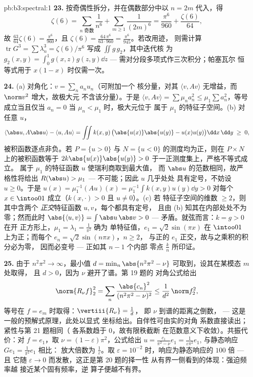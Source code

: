 \begin{solution}{pb:b3:spectral:1}
\textbf{23.} 按奇偶性拆分，并在偶数部分中以 $n = 2m$
代入，得
\[
\zeta(6) = \sum_{n\text{ 奇数}}\frac1{n^6} +
\sum_{m\geq1}\frac1{(2m)^6}
= \frac{\pi^6}{960} + \frac{\zeta(6)}{64},
\]
故 $\frac{63}{64}\zeta(6) = \frac{\pi^6}{960}$，且 $\zeta(6)
= \frac{64\,\pi^6}{63\cdot960} = \frac{\pi^6}{945}$。若改用迹，
则需计算 $\operatorname{tr}G^3 =
\sum\lambda_n^3 = \zeta(6)/\pi^6$ 写成 $\iint g\,g_2$，其中迭代核
为 $g_2(x,y) = \int_0^1g(x,z)g(z,y)\dd z$ ---
需对分段多项式作三次积分；帕塞瓦尔
恒等式用于 $x(1-x)$ 时仅需一次。

\textbf{24.} (a) 对角化：$v = \sum_na_nu_n$（可附加一个
核分量，对其 $\langle v, Av\rangle$
无增益，而 $\norm v^2$ 增大，故极大元
不含该分量）。于是 $\langle v, Av\rangle = \sum\mu_na_n^2 \leq
\mu_1\sum a_n^2$，等号成立当且仅当 $a_n = 0$
当 $\mu_n < \mu_1$ 时，极大元位于
属于 $\mu_1$ 的特征子空间。(b) 对任意 $u$，
\[
\langle\abs u, A\abs u\rangle - \langle u, Au\rangle
= \iint k(x,y)\,\bigl(\abs{u(x)}\abs{u(y)} -
u(x)u(y)\bigr)\dd x\,\dd y \;\geq\; 0,
\]
被积函数逐点非负。若 $P = \{u >
0\}$ 与 $N = \{u < 0\}$ 的测度均为正，则在
$P\times N$ 上的被积函数等于 $2k\abs{u(x)}\abs{u(y)} >
0$ 于一正测度集上，严格不等式成立。
属于 $\mu_1$ 的特征函数 $u$ 使瑞利商取到最大值，
而 $\abs u$ 的范数相同，故严格性将给出
$R(\abs u) > \mu_1$ --- 不可能；因此 $u$ 几乎处处
具有定号，不妨设 $u \geq 0$。于是 $u(x) = \mu_1^{-1}(Au)(x) =
\mu_1^{-1}\int k(x,y)u(y)\dd y > 0$ 对每个 $x \in
\intoo01$ 成立（$k(x,\cdot) > 0$ 且 $u \neq 0$）。(c) 若
特征子空间的维数 $\geq 2$，则其中含两个
\emph{正交}特征函数 $u, v$，每个都具有定号，
且由 (b) 知其在内部处处不为零；然而此时
$\abs{\langle u, v\rangle} = \int\abs u\,\abs v > 0$ ---
矛盾。就弦而言：$k = g > 0$ 在开
正方形上，$\mu_1 = \lambda_1 = \frac1{\pi^2}$ 确为
单特征值，$e_1 = \sqrt2\sin(\pi x)$ 在
$\intoo01$ 上为正；而每个 $e_n = \sqrt2\sin(n\pi x)$，$n \geq 2$，
与正的 $e_1$ 正交，故与之乘积的积分必为零，
因而必变号 --- 正如其 $n - 1$ 个内部
零点 $\frac kn$ 所印证。

\textbf{25.} 由于 $n^2\pi^2 \to \infty$，最小值 $d =
\min_n\abs{n^2\pi^2 - \nu}$ 可取到，设其在某模态 $m$ 处取得，
且 $d > 0$，因为 $\nu$ 避开了谱。第 19 题的
对角公式给出
\[
\norm{R_\nu f}_2^2 =
\sum_n\frac{\abs{c_n}^2}{(n^2\pi^2 - \nu)^2}
\leq \frac1{d^2}\,\norm f_2^2,
\]
等号在 $f = e_m$ 时取得：$\vertiii{R_\nu} = \frac1d$，
即 $\nu$ 到谱的距离之倒数，
--- 这是一般的预解式原理，此处以显式
坐标给出。自伴性可由实的对角
系数直接读出；紧性与第 21 题相同（
各系数趋于 $0$，故有限秩截断
在范数意义下收敛）。共振代价：对 $f = e_1$，取 $\nu =
(1-\varepsilon)\pi^2$，公式给出 $u =
\frac{c_1}{\pi^2 - \nu}e_1 = \frac1{\varepsilon\pi^2}e_1$,
与静态响应 $Ge_1 = \frac1{\pi^2}e_1$ 相比：
放大倍数为 $\frac1\varepsilon$。取 $\varepsilon =
10^{-2}$ 时，响应为静态响应的 $100$ 倍 --- 且
它随 $\varepsilon \to 0$ 而发散，这正是第 20 题的择一性
从有界一侧看到的体现：强迫频率越
接近某个固有频率，逆
算子便越不有界。
\end{solution}
